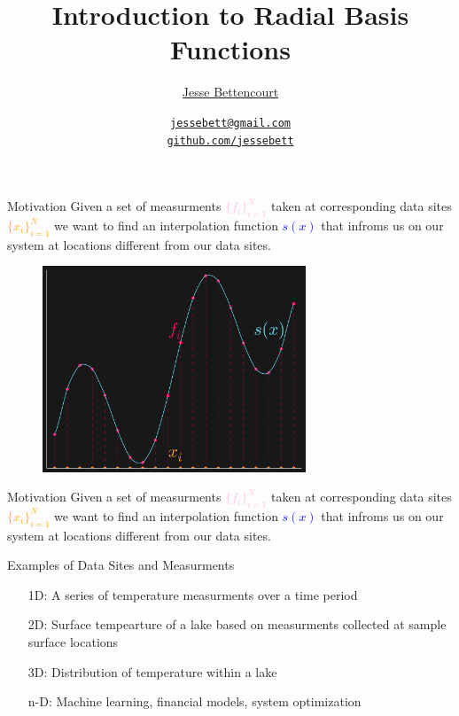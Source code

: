 \documentclass[12pt,t]{beamer}
\title{Introduction to Radial Basis Functions}
\subtitle{}
\author{\href{https://github.com/jessebett/}{Jesse Bettencourt}}
\institute{McMaster University}
\date{\href{jessebett@gmail.com}{\tt \scriptsize jessebett@gmail.com}
\\[-4pt]
\href{http://github.com/jessebett}{\tt \scriptsize github.com/jessebett}
}
\newcommand{\subt}[1]{{\footnotesize \color{subtitle} {#1}}}
\begin{document}
\begin{frame}
  \titlepage
  \note{}
\end{frame}

\begin{frame}{Motivation}
Given a set of measurments \textcolor{pink}{$\{f_i\}_{i=1}^N$}
taken at corresponding data sites \textcolor{orange}{$\{x_i\}_{i=1}^N$}
we want to find an interpolation function \textcolor{blue}{$s(x)$}
that infroms us on our system at locations different from our data sites.\\
\bigskip 

\begin{figure}
\includegraphics[width=0.7\textwidth, keepaspectratio]{fig1.png}
\end{figure}

\note{}
\end{frame}
\begin{frame}{Motivation}
Given a set of measurments \textcolor{pink}{$\{f_i\}_{i=1}^N$}
taken at corresponding data sites \textcolor{orange}{$\{x_i\}_{i=1}^N$}
we want to find an interpolation function \textcolor{blue}{$s(x)$}
that infroms us on our system at locations different from our data sites.\\
\bigskip 

\subt{Examples of Data Sites and Measurments}
\begin{itemize}
\item[1D:] A series of temperature measurments over a time period
\item[2D:] Surface tempearture of a lake based on measurments collected at sample surface locations 
\item[3D:] Distribution of temperature within a lake
\item[n-D:] Machine learning, financial models, system optimization
\end{itemize}

\note{}
\end{frame}
\end{document}
